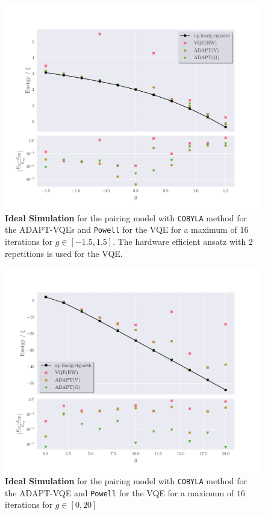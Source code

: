 \begin{figure}[ht]
    \centering
    \includegraphics[width=\linewidth]{image/pairing_result/ideal simulation/noisy-16-sm.pdf}
    \caption{\textbf{Ideal Simulation} for the pairing model with \texttt{COBYLA} method for the ADAPT-VQEs and \texttt{Powell} for the VQE for a maximum of $ 16 $ iterations for $ g \in[-1.5,1.5] $. The hardware efficient ansatz with 2 repetitions is used for the VQE.}
	\label{fig:small-main-noisy}
\end{figure}
\begin{figure}[ht]
    \centering
    \includegraphics[width=\linewidth]{image/pairing_result/ideal simulation/noisy-16-big.pdf}
    \caption{\textbf{Ideal Simulation} for the pairing model with \texttt{COBYLA} method for the ADAPT-VQE and \texttt{Powell} for the VQE for a maximum of $ 16 $ iterations for $ g \in[0,20] $} 
    \label{fig:big-main-noisy}
\end{figure}

